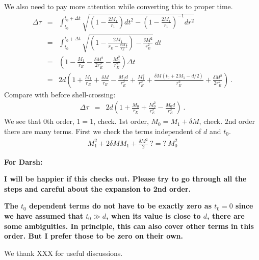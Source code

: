 \documentclass[12pt,letterpaper]{JHEP3}
\begin{document}
We also need to pay more attention while converting this to proper time.
\begin{eqnarray}
\Delta \tau &=& \int_{t_0}^{t_0+\Delta t}
 \sqrt{\left(1-\frac{2M_{1}}{r_1}\right)dt^2 - \left(1-\frac{2M_{1}}{r_1}\right)^{-1}dr^2} 
 \\ \nonumber
&=& \int_{t_0}^{t_0+\Delta t} 
\sqrt{\left(1 - \frac{2M_{1}}{r_E - \frac{\delta M}{r_E}t}\right) - \frac{\delta M^2}{r_E^2} }
~dt \\ \nonumber
&=& \left(1 - \frac{M_{1}}{r_E} - \frac{\delta M^2}{2r_E^2} - \frac{M_{1}^2}{r_E^2} \right)
\Delta t \\ \nonumber
&=& 2d \left( 1 + \frac{M_1}{r_E} + \frac{\delta M}{r_E} -\frac{M_1d}{r_E^2}+ \frac{M_1^2}{r_E^2}+ \frac{\delta M (t_0+2M_1-d/2)}{r_E^2} + \frac{\delta M^2}{2r_E^2} \right)~.
\end{eqnarray}
Compare with before shell-crossing:
\begin{eqnarray}
\Delta \tau &=& 2d
\left(1 + \frac{M_{0}}{r_E} + \frac{M_{0}^2}{r_E^2} - \frac{M_{0}d}{r_E^2}\right)~.
\end{eqnarray}
We see that $0$th order, $1=1$, check. $1$st order, $M_0 = M_1+\delta M$, check. $2$nd order there are many terms. First we check the terms independent of $d$ and $t_0$.
\begin{eqnarray}
M_1^2+2\delta M M_1 + \frac{\delta M^2}{2} ~?=?~ M_0^2
\end{eqnarray}

{\bf For Darsh:}

{\bf I will be happier if this checks out. Please try to go through all the steps and careful about the expansion to 2nd order.}

{\bf The $t_0$ dependent terms do not have to be exactly zero as $t_0=0$ since we have assumed that $t_0\gg d$, when its value is close to $d$, there are some ambiguities. In principle, this can also cover other terms in this order. But I prefer those to be zero on their own.}


\acknowledgments

We thank XXX for useful discussions. 
\appendix





\appendix
\end{document}
